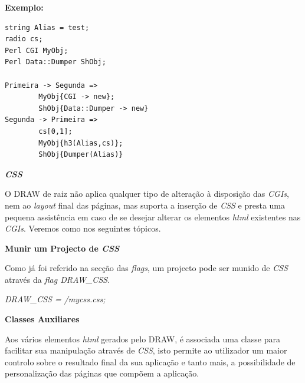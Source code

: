 \documentclass[a4paper]{article}
\begin{document}
\textbf{Exemplo:}

\begin{small}
\begin{lstlisting}
string Alias = test;
radio cs;
Perl CGI MyObj;
Perl Data::Dumper ShObj;

Primeira -> Segunda =>
        MyObj{CGI -> new};
        ShObj{Data::Dumper -> new}
Segunda -> Primeira =>
        cs[0,1];
        MyObj{h3(Alias,cs)};
        ShObj{Dumper(Alias)}
\end{lstlisting}
\end{small}

\vspace{.2cm}

\begin{large}
\textbf{\emph{CSS}}\\
\end{large}

\hspace{1cm}O DRAW de raiz não aplica qualquer tipo de alteração à disposição das \emph{CGIs}, nem ao \emph{layout} final das páginas,
mas suporta a inserção de \emph{CSS} e presta uma pequena assistência em caso de se desejar alterar os elementos \emph{html} existentes
nas \emph{CGIs}. Veremos como nos seguintes tópicos.\\

\begin{normalsize}
\textbf{Munir um Projecto de \emph{CSS}}\\
\end{normalsize}

\hspace{1cm}Como já foi referido na secção das \emph{flags}, um projecto pode ser munido de \emph{CSS} através da \emph{flag DRAW\_CSS}.

\begin{center}
\begin{small}
\emph{DRAW\_CSS = /mycss.css;}
\end{small}
\end{center}

\begin{normalsize}
\textbf{Classes Auxiliares}\\
\end{normalsize}

\hspace{1cm}Aos vários elementos \emph{html} gerados pelo DRAW, é associada uma classe para facilitar sua manipulação através de
\emph{CSS}, isto permite ao utilizador um maior controlo sobre o resultado final da sua aplicação e tanto mais, a possibilidade de
personalização das páginas que compõem a aplicação.\\
\end{document}
